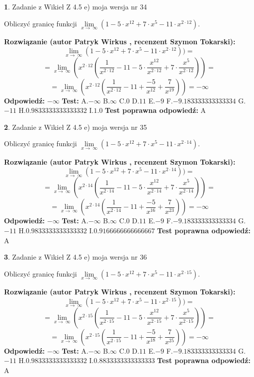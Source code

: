\documentclass[12pt, a4paper]{article}
\theoremstyle{definition} %
\newtheorem{zad}{}
\newcommand{\zadStart}[1]{\begin{zad}#1\newline}
\newcommand{\zadStop}{\end{zad}}
\newcommand{\rozwStart}[2]{\noindent \textbf{Rozwiązanie (autor #1 , recenzent #2): }\newline}
\newcommand{\rozwStop}{\newline}
\newcommand{\odpStart}{\noindent \textbf{Odpowiedź:}\newline}
\newcommand{\odpStop}{\newline}
\newcommand{\testStart}{\noindent \textbf{Test:}\newline}
\newcommand{\testStop}{\newline}
\newcommand{\kluczStart}{\noindent \textbf{Test poprawna odpowiedź:}\newline}
\newcommand{\kluczStop}{\newline}
\begin{document}
\zadStart{Zadanie z Wikieł Z 4.5 e) moja wersja nr 34}


Obliczyć granicę funkcji  $\lim\limits_{x\to\ \infty}(1 - 5 \cdot x^{12}+7 \cdot x^{5}- 11 \cdot x^{2\cdot12})$.
\zadStop
\rozwStart{Patryk Wirkus}{Szymon Tokarski}
$$\lim\limits_{x\to\ \infty}(1 - 5 \cdot x^{12}+7 \cdot x^{5}- 11 \cdot x^{2\cdot12}))=$$
$$=\lim\limits_{x\to\ \infty}(x^{2\cdot12}(\frac{1}{x^{2\cdot12}}-11 -5 \cdot \frac{x^{12}}{x^{2\cdot12}}+7 \cdot \frac{x^{5}}{x^{2\cdot12}}))=$$
$$=\lim\limits_{x\to\ \infty}(x^{2\cdot12}(\frac{1}{x^{2\cdot12}}-11 + \frac{-5}{x^{12}}+ \frac{7}{x^{19}}))=-\infty$$
\rozwStop
\odpStart
$-\infty$
\odpStop
\testStart
A.$-\infty$ B.$\infty$ C.$0$ D.$11$ E.$-9$
F.$-9.183333333333334$ G.$-11$
H.$0.9833333333333332$
I.$1.0$
\testStop
\kluczStart
A
\kluczStop



\zadStart{Zadanie z Wikieł Z 4.5 e) moja wersja nr 35}


Obliczyć granicę funkcji  $\lim\limits_{x\to\ \infty}(1 - 5 \cdot x^{12}+7 \cdot x^{5}- 11 \cdot x^{2\cdot14})$.
\zadStop
\rozwStart{Patryk Wirkus}{Szymon Tokarski}
$$\lim\limits_{x\to\ \infty}(1 - 5 \cdot x^{12}+7 \cdot x^{5}- 11 \cdot x^{2\cdot14}))=$$
$$=\lim\limits_{x\to\ \infty}(x^{2\cdot14}(\frac{1}{x^{2\cdot14}}-11 -5 \cdot \frac{x^{12}}{x^{2\cdot14}}+7 \cdot \frac{x^{5}}{x^{2\cdot14}}))=$$
$$=\lim\limits_{x\to\ \infty}(x^{2\cdot14}(\frac{1}{x^{2\cdot14}}-11 + \frac{-5}{x^{16}}+ \frac{7}{x^{23}}))=-\infty$$
\rozwStop
\odpStart
$-\infty$
\odpStop
\testStart
A.$-\infty$ B.$\infty$ C.$0$ D.$11$ E.$-9$
F.$-9.183333333333334$ G.$-11$
H.$0.9833333333333332$
I.$0.9166666666666667$
\testStop
\kluczStart
A
\kluczStop



\zadStart{Zadanie z Wikieł Z 4.5 e) moja wersja nr 36}


Obliczyć granicę funkcji  $\lim\limits_{x\to\ \infty}(1 - 5 \cdot x^{12}+7 \cdot x^{5}- 11 \cdot x^{2\cdot15})$.
\zadStop
\rozwStart{Patryk Wirkus}{Szymon Tokarski}
$$\lim\limits_{x\to\ \infty}(1 - 5 \cdot x^{12}+7 \cdot x^{5}- 11 \cdot x^{2\cdot15}))=$$
$$=\lim\limits_{x\to\ \infty}(x^{2\cdot15}(\frac{1}{x^{2\cdot15}}-11 -5 \cdot \frac{x^{12}}{x^{2\cdot15}}+7 \cdot \frac{x^{5}}{x^{2\cdot15}}))=$$
$$=\lim\limits_{x\to\ \infty}(x^{2\cdot15}(\frac{1}{x^{2\cdot15}}-11 + \frac{-5}{x^{18}}+ \frac{7}{x^{25}}))=-\infty$$
\rozwStop
\odpStart
$-\infty$
\odpStop
\testStart
A.$-\infty$ B.$\infty$ C.$0$ D.$11$ E.$-9$
F.$-9.183333333333334$ G.$-11$
H.$0.9833333333333332$
I.$0.8833333333333333$
\testStop
\kluczStart
A
\kluczStop
\end{document}
